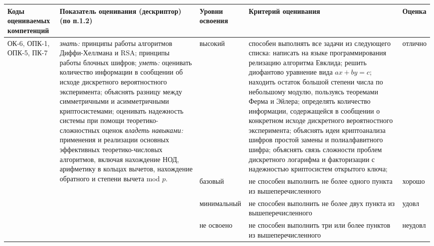 \documentclass[a4paper,12pt]{article}
\begin{document}
\begin{longtable}{|p{15mm}|p{53mm}|p{16mm}|p{43mm}|p{14mm}|}
\hline
  \centering\small Коды оцениваемых компетенций
& \centering Показатель оценивания (дескриптор) (по п.1.2) 
& \centering\small Уровни освоения 
& \centering Критерий оценивания 
& \centering\small\arraybackslash Оценка
\\
\hline

\multirow{4}{15mm}{ОК-6, ОПК-1, ОПК-5, ПК-7}
&
\multirow{4}{53mm}{\parbox{53mm}{%
\vrule width 0pt height 10pt \emph{знать:}\newline
принципы работы алгоритмов Диффи-Хеллмана и RSA; принципы работы блочных шифров; \newline
\emph{уметь:}\newline
оценивать количество информации в сообщении об исходе дискретного вероятностного эксперимента; объяснять разницу между симметричными и асимметричными криптосистемами; оценивать надежность системы при помощи теоретико-сложностных оценок \newline
\emph{владеть навыками:}\newline
применения и реализации основных эффективных теоретико-числовых алгоритмов, включая нахождение НОД, арифметику в кольцах вычетов, нахождение обратного и степени вычета mod $p$. 
}}
& 
высокий & \raggedright\arraybackslash способен выполнять все задачи из следующего списка:
написать на языке программирования релизацию алгоритма Евклида;
решить диофантово уравнение вида $ax+by=c$;
находить остаток большой степени числа по небольшому модулю, пользуясь теоремами Ферма и Эйлера;
определять количество информации, содержащейся в сообщении о конкретном исходе дискретного вероятностного эксперимента;
объяснять идеи криптоанализа шифров простой замены и полиалфавитного шифра;
объяснять связь сложности проблем дискретного логарифма и факторизации с надежностью криптосистем открытого ключа; & отлично 
\\ 

\cline{3-5}
& & базовый & не способен выполнить не более одного пункта из вышеперечисленного & хорошо 
\\

\cline{3-5}
& & мини\-мальный & не способен выполнить не более двух пункта из вышеперечисленного & удовл 
\\

\cline{3-5}
& & не освоено & не способен выполнить три или более пунктов из вышеперечисленного & неудовл 
\\

\hline

\end{longtable}
\end{document}
